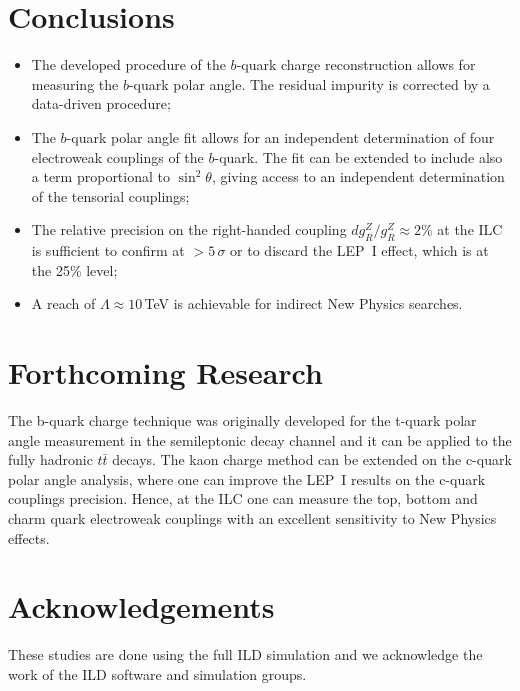 \documentclass{PoS}
\begin{document}

\section*{Conclusions}

\begin{itemize}
	\item The developed procedure of the $b$-quark charge reconstruction allows for measuring the $b$-quark polar angle. The residual impurity is corrected by a data-driven procedure;
	\item The $b$-quark polar angle fit allows for an independent determination of four electroweak couplings of the $b$-quark. The fit can be extended to include also a term proportional to $\sin^2\theta$, giving access to an independent determination of the tensorial couplings;
	\item  The relative precision on the right-handed coupling $dg^Z_R/g^Z_R\approx 2$\% at the ILC is sufficient to confirm at $>5\,\sigma$ or to discard the LEP~I effect, which is at the 25\% level;
	\item A reach of $\Lambda \approx 10$\,TeV is achievable for indirect New Physics searches.
\end{itemize}


\section*{Forthcoming Research}
The b-quark charge technique was originally developed for the t-quark polar angle measurement in the semileptonic decay channel and it can be applied to the fully hadronic $t\bar{t}$ decays.
The kaon charge method can be extended on the c-quark polar angle analysis, where one can improve the LEP~I results on the c-quark couplings precision. 
Hence, at the ILC one can measure the top, bottom and charm quark electroweak couplings with an excellent sensitivity to New Physics effects.

\section*{Acknowledgements}

These studies are done using the full ILD simulation and we acknowledge the work of the ILD software and simulation groups.



 

\end{document}
